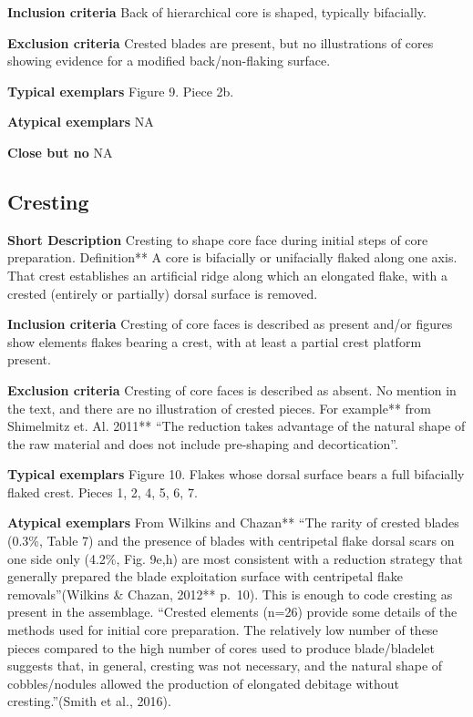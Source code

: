 \documentclass[
]{article}
\begin{document}
\textbf{Inclusion criteria} Back of hierarchical core is shaped,
typically bifacially.

\textbf{Exclusion criteria} Crested blades are present, but no
illustrations of cores showing evidence for a modified back/non-flaking
surface.

\textbf{Typical exemplars} Figure 9. Piece 2b.

\textbf{Atypical exemplars} NA

\textbf{Close but no} NA

\hypertarget{cresting}{%
\subsection{Cresting}\label{cresting}}

\textbf{Short Description} Cresting to shape core face during initial
steps of core preparation. Definition** A core is bifacially or
unifacially flaked along one axis. That crest establishes an artificial
ridge along which an elongated flake, with a crested (entirely or
partially) dorsal surface is removed.

\textbf{Inclusion criteria} Cresting of core faces is described as
present and/or figures show elements flakes bearing a crest, with at
least a partial crest platform present.

\textbf{Exclusion criteria} Cresting of core faces is described as
absent. No mention in the text, and there are no illustration of crested
pieces. For example** from Shimelmitz et. Al. 2011** ``The reduction
takes advantage of the natural shape of the raw material and does not
include pre-shaping and decortication''.

\textbf{Typical exemplars} Figure 10. Flakes whose dorsal surface bears
a full bifacially flaked crest. Pieces 1, 2, 4, 5, 6, 7.

\textbf{Atypical exemplars} From Wilkins and Chazan** ``The rarity of
crested blades (0.3\%, Table 7) and the presence of blades with
centripetal flake dorsal scars on one side only (4.2\%, Fig. 9e,h) are
most consistent with a reduction strategy that generally prepared the
blade exploitation surface with centripetal flake removals''(Wilkins \&
Chazan, 2012** p.~10). This is enough to code cresting as present in the
assemblage. ``Crested elements (n=26) provide some details of the
methods used for initial core preparation. The relatively low number of
these pieces compared to the high number of cores used to produce
blade/bladelet suggests that, in general, cresting was not necessary,
and the natural shape of cobbles/nodules allowed the production of
elongated debitage without cresting.''(Smith et al., 2016).
\end{document}
